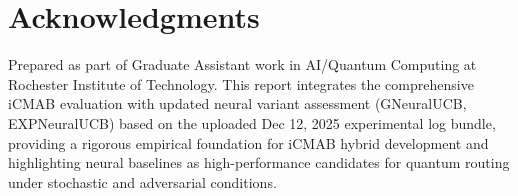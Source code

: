 \documentclass[12pt,a4paper]{article}
\begin{document}
\newpage
\section{Acknowledgments}

Prepared as part of Graduate Assistant work in AI/Quantum Computing at Rochester Institute of Technology. This report integrates the comprehensive iCMAB evaluation with updated neural variant assessment (GNeuralUCB, EXPNeuralUCB) based on the uploaded Dec 12, 2025 experimental log bundle, providing a rigorous empirical foundation for iCMAB hybrid development and highlighting neural baselines as high-performance candidates for quantum routing under stochastic and adversarial conditions.
\end{document}
